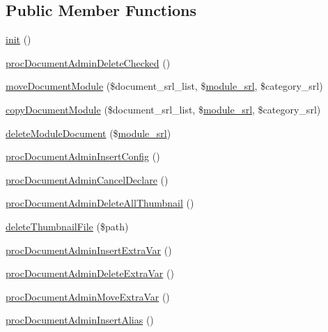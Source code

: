 \subsection*{Public Member Functions}
\begin{DoxyCompactItemize}
\item 
\hyperlink{classdocumentAdminController_a14485f8ce213e059c30b41e6add269f9}{init} ()
\item 
\hyperlink{classdocumentAdminController_a98c455685a7e8e4ab6633a8a66e6f712}{proc\-Document\-Admin\-Delete\-Checked} ()
\item 
\hyperlink{classdocumentAdminController_a2534cbf35966a4ad561b995b7029bc00}{move\-Document\-Module} (\$document\-\_\-srl\-\_\-list, \$\hyperlink{ko_8install_8php_a370bb6450fab1da3e0ed9f484a38b761}{module\-\_\-srl}, \$category\-\_\-srl)
\item 
\hyperlink{classdocumentAdminController_a9133d1466cbf4baae410f180f8b04e34}{copy\-Document\-Module} (\$document\-\_\-srl\-\_\-list, \$\hyperlink{ko_8install_8php_a370bb6450fab1da3e0ed9f484a38b761}{module\-\_\-srl}, \$category\-\_\-srl)
\item 
\hyperlink{classdocumentAdminController_a3b1295649c5dff5b1a63a20aef1afa99}{delete\-Module\-Document} (\$\hyperlink{ko_8install_8php_a370bb6450fab1da3e0ed9f484a38b761}{module\-\_\-srl})
\item 
\hyperlink{classdocumentAdminController_a8b865a9f22d0ca1df7967b4a179f4197}{proc\-Document\-Admin\-Insert\-Config} ()
\item 
\hyperlink{classdocumentAdminController_af6c4d0820de6d6fcbd3d7d2544f97050}{proc\-Document\-Admin\-Cancel\-Declare} ()
\item 
\hyperlink{classdocumentAdminController_a9ff3a9934c8bfa4d2ded4287920c0362}{proc\-Document\-Admin\-Delete\-All\-Thumbnail} ()
\item 
\hyperlink{classdocumentAdminController_a9354a64cd8470838a0cf5705290cb4c5}{delete\-Thumbnail\-File} (\$path)
\item 
\hyperlink{classdocumentAdminController_a8f766283de71f7b22d325eb8dd8b4053}{proc\-Document\-Admin\-Insert\-Extra\-Var} ()
\item 
\hyperlink{classdocumentAdminController_a44eca9af136c50f1d6624a4de83b596a}{proc\-Document\-Admin\-Delete\-Extra\-Var} ()
\item 
\hyperlink{classdocumentAdminController_a037c8e048b5cd6199dd83abbfcb7b92e}{proc\-Document\-Admin\-Move\-Extra\-Var} ()
\item 
\hyperlink{classdocumentAdminController_aa25a9a3e7a5ba0c15b50cc4d324386bc}{proc\-Document\-Admin\-Insert\-Alias} ()

\end{DoxyCompactItemize}
